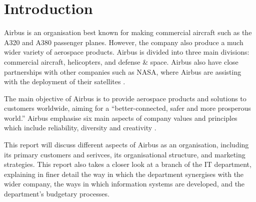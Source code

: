 \section{Introduction}
Airbus is an organisation best known for making commercial aircraft such as the A320 and A380 passenger planes. However, the company also produce a much wider variety of aerospace products. Airbus is divided into three main divisions: commercial aircraft, helicopters, and defense \& space. Airbus also have close partnerships with other companies such as NASA, where Airbus are assisting with the deployment of their satellites \parencite{airbus2018a}.


The main objective of Airbus is to provide aerospace products and solutions to customers worldwide, aiming for a \enquote{better-connected, safer and more prosperous world.} \parencite{airbus2018b} Airbus emphasise six main aspects of company values and principles which include reliability, diversity and creativity \parencite{airbus2018c}.


This report will discuss different aspects of Airbus as an organisation, including its primary customers and serivces, its organisational structure, and marketing strategies. This report also takes a closer look at a branch of the IT department, explaining in finer detail the way in which the department synergises with the wider company, the ways in which information systems are developed, and the department's budgetary processes.

